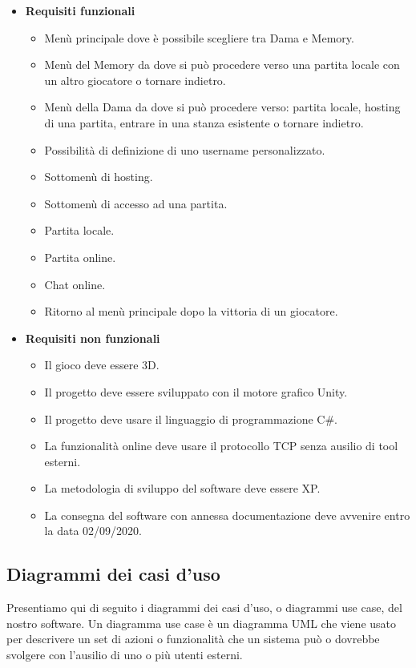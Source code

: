 \documentclass[12pt]{article}
\begin{document}
\begin{itemize}
\item \textbf{Requisiti funzionali}
\begin{itemize}
\item Menù principale dove è possibile scegliere tra Dama e Memory.
\item Menù del Memory da dove si può procedere verso una partita locale con un altro giocatore o tornare indietro.
\item Menù della Dama da dove si può procedere verso: partita locale, hosting di una partita, entrare in una stanza esistente o tornare indietro.
\item Possibilità di definizione di uno username personalizzato.
\item Sottomenù di hosting.
\item Sottomenù di accesso ad una partita.
\item Partita locale.
\item Partita online.
\item Chat online.
\item Ritorno al menù principale dopo la vittoria di un giocatore.
\end{itemize}
\item \textbf{Requisiti non funzionali}
\begin{itemize}
\item Il gioco deve essere 3D.
\item Il progetto deve essere sviluppato con il motore grafico Unity.
\item Il progetto deve usare il linguaggio di programmazione C\#.
\item La funzionalità online deve usare il protocollo TCP senza ausilio di tool esterni.
\item La metodologia di sviluppo del software deve essere XP.
\item La consegna del software con annessa documentazione deve avvenire entro la data 02/09/2020.
\end{itemize}
\end{itemize}

\subsection{Diagrammi dei casi d'uso}
Presentiamo qui di seguito i diagrammi dei casi d'uso, o diagrammi use case, del nostro software. Un diagramma use case è un diagramma UML che viene usato per descrivere un set di azioni o funzionalità che un sistema può o dovrebbe svolgere con l'ausilio di uno o più utenti esterni.
\end{document}
